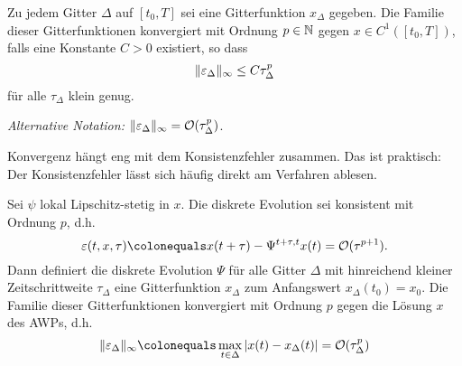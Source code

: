 \begin{defi}
	Zu jedem Gitter $\Delta$ auf $[t_0,T]$ sei eine Gitterfunktion $x_{\Delta}$ gegeben. Die Familie dieser Gitterfunktionen konvergiert mit Ordnung $p \in \mathbb N$ gegen $x \in C^1([t_0,T])$, falls eine Konstante $C>0$ existiert, so dass
	\begin{equation*}
		\lVert \varepsilon_{\Delta} \rVert_\infty \leq C \tau_{\Delta}^p
	\end{equation*}
	für alle $\tau_{\Delta}$ klein genug.
\end{defi}

\emph{Alternative Notation:} $\lVert \varepsilon_\Delta \rVert_\infty = \mathcal{O}(\tau^p_\Delta)$.

Konvergenz hängt eng mit dem Konsistenzfehler zusammen. Das ist praktisch: Der Konsistenzfehler lässt sich häufig direkt am Verfahren ablesen.


\begin{satz}
	Sei $\psi$ lokal Lipschitz-stetig in $x$. Die diskrete Evolution sei konsistent mit Ordnung $p$, d.h.
	\begin{equation*}
		\varepsilon(t,x,\tau) \colonequals x(t+\tau)-\Psi^{t+\tau,t} x(t)=\mathcal{O} (\tau^{p+1}).
	\end{equation*}
	Dann definiert die diskrete Evolution $\Psi$ für alle Gitter $\Delta$ mit hinreichend kleiner Zeitschrittweite $\tau_{\Delta}$ eine Gitterfunktion $x_{\Delta}$ zum Anfangswert $x_\Delta(t_0) = x_0$.
	Die Familie dieser Gitterfunktionen konvergiert mit Ordnung $p$ gegen die Lösung $x$ des AWPs, d.h.
	\begin{equation*}
		\norm{\varepsilon_{\Delta}}_{\infty}
		\colonequals
		\max_{t \in \Delta} \vert x(t)-x_{\Delta} (t) \vert =\mathcal{O} (\tau_{\Delta}^p)
	\end{equation*}
\end{satz}

